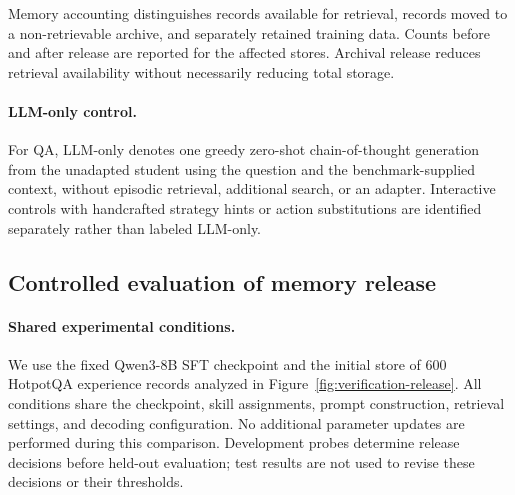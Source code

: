 Memory accounting distinguishes records available for
retrieval, records moved to a non-retrievable archive, and
separately retained training data. Counts before and after
release are reported for the affected stores. Archival
release reduces retrieval availability without necessarily
reducing total storage.

\paragraph{LLM-only control.}
For QA, LLM-only denotes one greedy zero-shot chain-of-thought
generation from the unadapted student using the question and
the benchmark-supplied context, without episodic retrieval,
additional search, or an adapter. Interactive controls with
handcrafted strategy hints or action substitutions are
identified separately rather than labeled LLM-only.

\subsection{Controlled evaluation of memory release}
\label{app:release-controls}

\paragraph{Shared experimental conditions.}
We use the fixed Qwen3-8B SFT checkpoint and the initial
store of 600 HotpotQA experience records analyzed in
Figure~\ref{fig:verification-release}.
All conditions share the checkpoint, skill assignments,
prompt construction, retrieval settings, and decoding
configuration. No additional parameter updates are
performed during this comparison.
Development probes determine release decisions before
held-out evaluation; test results are not used to revise
these decisions or their thresholds.

